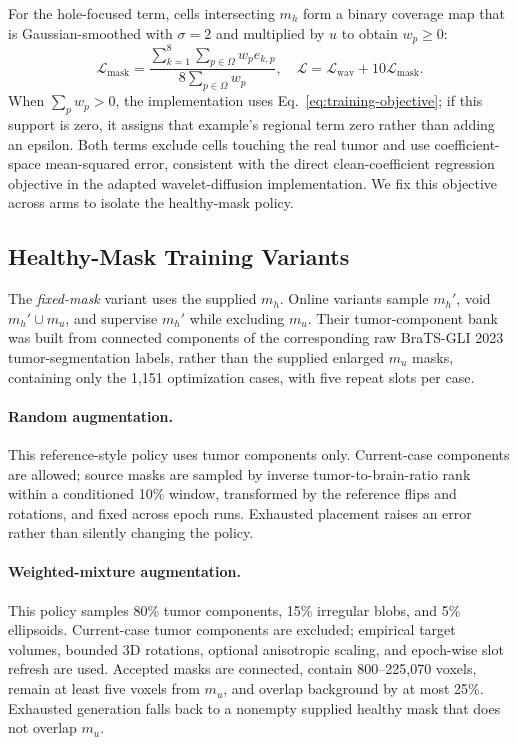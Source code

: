 \documentclass[runningheads]{llncs}
\begin{document}
For the hole-focused term, cells intersecting $m_h$ form a binary coverage map that is Gaussian-smoothed with $\sigma=2$ and multiplied by $u$ to obtain $w_p\ge0$:
\begin{equation}
\mathcal L_{\mathrm{mask}}=
\frac{\sum_{k=1}^{8}\sum_{p\in\Omega}w_p e_{k,p}}
{8\sum_{p\in\Omega}w_p},
\quad
\mathcal L=\mathcal L_{\mathrm{wav}}+10\mathcal L_{\mathrm{mask}}.
\label{eq:training-objective}
\end{equation}
When $\sum_p w_p>0$, the implementation uses Eq.~\eqref{eq:training-objective}; if this support is zero, it assigns that example's regional term zero rather than adding an epsilon. Both terms exclude cells touching the real tumor and use coefficient-space mean-squared error, consistent with the direct clean-coefficient regression objective in the adapted wavelet-diffusion implementation. We fix this objective across arms to isolate the healthy-mask policy.

\subsection{Healthy-Mask Training Variants} \label{sec:method:augmentation}

The \emph{fixed-mask} variant uses the supplied $m_h$. Online variants sample $m_h'$, void $m_h'\cup m_u$, and supervise $m_h'$ while excluding $m_u$. Their tumor-component bank was built from connected components of the corresponding raw BraTS-GLI 2023 tumor-segmentation labels, rather than the supplied enlarged $m_u$ masks, containing only the 1,151 optimization cases, with five repeat slots per case.

\paragraph{\textbf{Random augmentation.}}
This reference-style policy uses tumor components only. Current-case components are allowed; source masks are sampled by inverse tumor-to-brain-ratio rank within a conditioned 10\% window, transformed by the reference flips and rotations, and fixed across epoch runs. Exhausted placement raises an error rather than silently changing the policy.

\paragraph{\textbf{Weighted-mixture augmentation.}}
This policy samples 80\% tumor components, 15\% irregular blobs, and 5\% ellipsoids. Current-case tumor components are excluded; empirical target volumes, bounded 3D rotations, optional anisotropic scaling, and epoch-wise slot refresh are used. Accepted masks are connected, contain 800--225,070 voxels, remain at least five voxels from $m_u$, and overlap background by at most 25\%. Exhausted generation falls back to a nonempty supplied healthy mask that does not overlap $m_u$.
\end{document}
